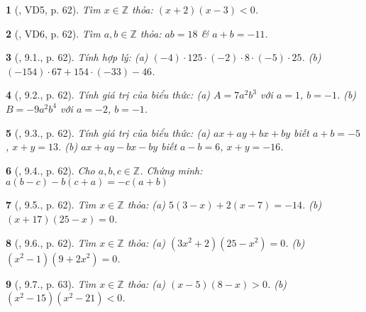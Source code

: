 \documentclass{article}
\newtheorem{baitoan}{}
\begin{document}
\begin{baitoan}[\cite{Binh_boi_duong_Toan_6_tap_1}, VD5, p. 62]
	Tìm $x\in\mathbb{Z}$ thỏa: $(x + 2)(x - 3) < 0$.
\end{baitoan}

\begin{baitoan}[\cite{Binh_boi_duong_Toan_6_tap_1}, VD6, p. 62]
	Tìm $a,b\in\mathbb{Z}$ thỏa: $ab = 18$ \& $a + b = -11$.
\end{baitoan}

\begin{baitoan}[\cite{Binh_boi_duong_Toan_6_tap_1}, 9.1., p. 62]
	Tính hợp lý: (a) $(-4)\cdot125\cdot(-2)\cdot8\cdot(-5)\cdot25$. (b) $(-154)\cdot67 + 154\cdot(-33) - 46$.
\end{baitoan}

\begin{baitoan}[\cite{Binh_boi_duong_Toan_6_tap_1}, 9.2., p. 62]
	Tính giá trị của biểu thức: (a) $A = 7a^2b^3$ với $a = 1$, $b = -1$. (b) $B = -9a^2b^4$ với $a = -2$, $b = -1$.
\end{baitoan}

\begin{baitoan}[\cite{Binh_boi_duong_Toan_6_tap_1}, 9.3., p. 62]
	Tính giá trị của biểu thức: (a) $ax + ay + bx + by$ biết $a + b = -5$, $x + y = 13$. (b) $ax + ay - bx - by$ biết $a - b = 6$, $x + y = -16$.
\end{baitoan}

\begin{baitoan}[\cite{Binh_boi_duong_Toan_6_tap_1}, 9.4., p. 62]
	Cho $a,b,c\in\mathbb{Z}$. Chứng minh: $a(b - c) - b(c + a) = -c(a + b)$
\end{baitoan}

\begin{baitoan}[\cite{Binh_boi_duong_Toan_6_tap_1}, 9.5., p. 62]
	Tìm $x\in\mathbb{Z}$ thỏa: (a) $5(3 - x) + 2(x - 7) = -14$. (b) $(x + 17)(25 - x) = 0$.
\end{baitoan}

\begin{baitoan}[\cite{Binh_boi_duong_Toan_6_tap_1}, 9.6., p. 62]
	Tìm $x\in\mathbb{Z}$ thỏa: (a) $(3x^2 + 2)(25 - x^2) = 0$. (b) $(x^2 - 1)(9 + 2x^2) = 0$.
\end{baitoan}

\begin{baitoan}[\cite{Binh_boi_duong_Toan_6_tap_1}, 9.7., p. 63]
	Tìm $x\in\mathbb{Z}$ thỏa: (a) $(x - 5)(8 - x) > 0$. (b) $(x^2 - 15)(x^2 - 21) < 0$.
\end{baitoan}
\end{document}
